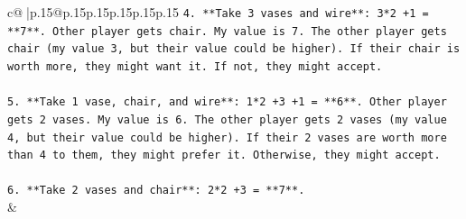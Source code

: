 \documentclass{article}
\begin{document}
{\begin{supertabular}{c@{$\;$}|p{.15\linewidth}@{}p{.15\linewidth}p{.15\linewidth}p{.15\linewidth}p{.15\linewidth}p{.15\linewidth}}
{{{\texttt{4. **Take 3 vases and wire**: 3*2 +1 = **7**. Other player gets chair. My value is 7. The other player gets chair (my value 3, but their value could be higher). If their chair is worth more, they might want it. If not, they might accept.} \\
\\ 
\texttt{5. **Take 1 vase, chair, and wire**: 1*2 +3 +1 = **6**. Other player gets 2 vases. My value is 6. The other player gets 2 vases (my value 4, but their value could be higher). If their 2 vases are worth more than 4 to them, they might prefer it. Otherwise, they might accept.} \\
\\ 
\texttt{6. **Take 2 vases and chair**: 2*2 +3 = **7**.} \\
            }
        }
    }
    & \\ \\


\end{supertabular}}
\end{document}
